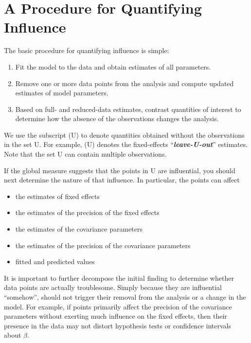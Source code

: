 \documentclass[Main.tex]{subfiles}
\begin{document}
\newpage
	
\section{A Procedure for Quantifying Influence}  %


The basic procedure for quantifying influence is simple:

\begin{enumerate}
	\item Fit the model to the data and obtain estimates of all parameters.
	\item Remove one or more data points from the analysis and compute updated estimates of model parameters.
	\item Based on full- and reduced-data estimates, contrast quantities of interest to determine how the absence
	of the observations changes the analysis.
\end{enumerate}
We use the subscript (U) to denote quantities obtained without the observations in the set U. For example,
(U) denotes the fixed-effects “\textit{\textbf{leave-U-out}}” estimates. Note that the set U can contain multiple observations.


If the global measure suggests that the points in U are influential, you should next determine the nature of
that influence. In particular, the points can affect
\begin{itemize}
	\item the estimates of fixed effects
	\item the estimates of the precision of the fixed effects
	\item the estimates of the covariance parameters
	\item the estimates of the precision of the covariance parameters
	\item fitted and predicted values
\end{itemize}

It is important to further decompose the initial finding to determine whether data points are actually troublesome.
Simply because they are influential “somehow”, should not trigger their removal from the analysis or
a change in the model. For example, if points primarily affect the precision of the covariance parameters
without exerting much influence on the fixed effects, then their presence in the data may not distort hypothesis
tests or confidence intervals about $\beta$.
\end{document}
